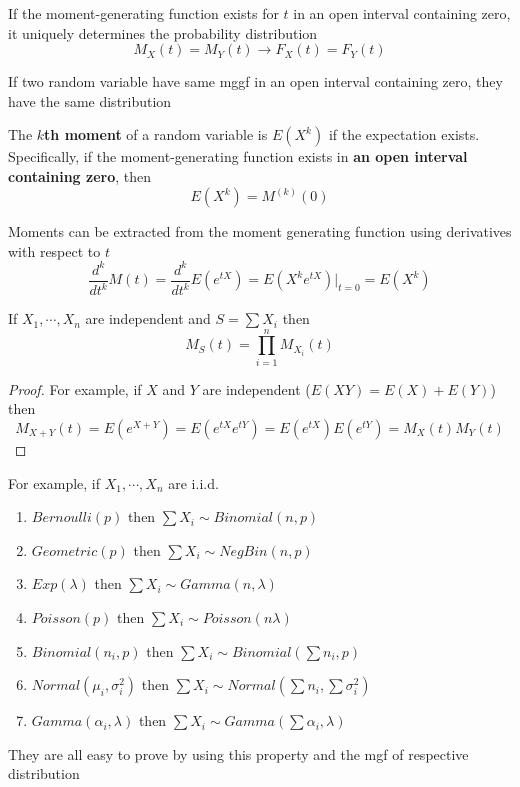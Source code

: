 \documentclass[11pt]{article}
\begin{document}
\begin{proposition*}
  If the moment-generating function exists for $t$ in an open interval containing zero, it uniquely determines the probability distribution
  \[
    M_X(t) = M_Y(t) \to F_X(t) = F_Y(t)
  \]
  \begin{rem}
      If two random variable have same mggf in an open interval containing zero, they have the same distribution
  \end{rem}
\end{proposition*}


\begin{proposition*}
  The \textbf{$k$th moment} of a random variable is $E(X^k)$ if the expectation exists. Specifically, if the moment-generating function exists in \textbf{an open interval containing zero}, then
  \[
    E(X^k) = M^{(k)}(0)
  \]
  \begin{rem}
    Moments can be extracted from the moment generating function using derivatives with respect to $t$
    \[
      \frac{d^k}{dt^k} M(t) = \frac{d^k}{dt^k} E(e^{tX}) = E(X^ke^{tX}) |_{t=0} = E(X^k)
    \]
  \end{rem}
\end{proposition*}



\begin{proposition*}
  If $X_1, \cdots, X_n$ are independent and $S = \sum X_i$ then
  \[
    M_S(t) = \prod_{i=1}^{n} M_{X_i} (t)
  \]
  \begin{proof}
    For example, if $X$ and $Y$ are independent ($E(XY) = E(X) + E(Y)$) then
    \[
      M_{X+Y}(t) = E(e^{X+Y}) = E(e^{tX}e^{tY}) = E(e^{tX})E(e^{tY}) = M_X(t)M_Y(t)
    \]

  \end{proof}
  \begin{rem}
    For example, if $X_1, \cdots, X_n$ are i.i.d.
    \begin{enumerate}
      \item $Bernoulli(p)$ then $\sum X_i \sim Binomial(n,p)$
      \item $Geometric(p)$ then $\sum X_i \sim NegBin(n,p)$
      \item $Exp(\lambda)$ then $\sum X_i \sim Gamma(n,\lambda)$
      \item $Poisson(p)$ then $\sum X_i \sim Poisson(n\lambda)$
      \item $Binomial(n_i,p)$ then $\sum X_i \sim Binomial(\sum n_i, p)$
      \item $Normal(\mu_i, \sigma_i^2)$ then $\sum X_i \sim Normal(\sum n_i, \sum \sigma_i^2)$
      \item $Gamma(\alpha_i, \lambda)$ then $\sum X_i \sim Gamma(\sum \alpha_i, \lambda)$
    \end{enumerate}
    They are all easy to prove by using this property and the mgf of respective distribution
  \end{rem}
\end{proposition*}
\end{document}
